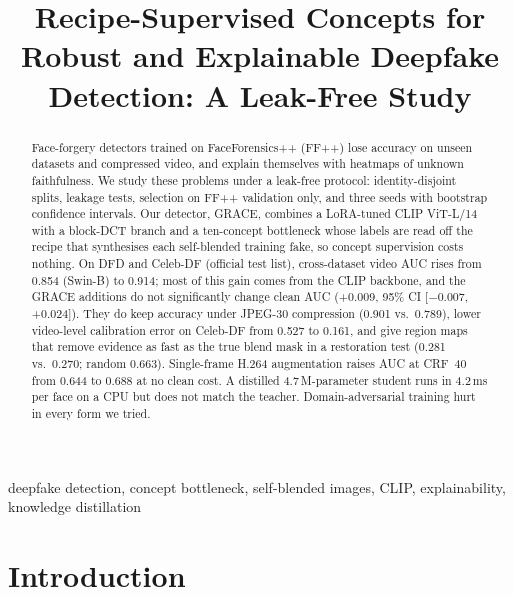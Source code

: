 \documentclass[conference]{IEEEtran}
\begin{document}
\title{Recipe-Supervised Concepts for Robust and Explainable Deepfake Detection: A Leak-Free Study}

\author{
}

\maketitle

\begin{abstract}
Face-forgery detectors trained on FaceForensics++ (FF++) lose accuracy on unseen datasets and compressed video,
and explain themselves with heatmaps of unknown faithfulness. We study these problems under a leak-free protocol:
identity-disjoint splits, leakage tests, selection on FF++ validation only, and three seeds with bootstrap
confidence intervals. Our detector, GRACE,
combines a LoRA-tuned CLIP ViT-L/14 with a block-DCT branch and a ten-concept bottleneck whose labels are read off
the recipe that synthesises each self-blended training fake, so concept supervision costs nothing. On DFD and
Celeb-DF (official test list), cross-dataset video AUC rises from 0.854 (Swin-B) to 0.914; most of this gain comes
from the CLIP backbone, and the GRACE additions do not significantly change clean AUC (+0.009, 95\% CI
[$-$0.007, +0.024]). They do keep accuracy under JPEG-30 compression (0.901 vs.\ 0.789), lower video-level
calibration error on Celeb-DF from 0.527 to 0.161, and give region maps that remove evidence as fast as the true
blend mask in a restoration test (0.281 vs.\ 0.270; random 0.663). Single-frame H.264 augmentation raises AUC at
CRF~40 from 0.644 to 0.688 at no clean cost. A distilled 4.7\,M-parameter student runs in 4.2\,ms per face on a CPU
but does not match the teacher. Domain-adversarial training hurt in every form we tried.
\end{abstract}

\begin{IEEEkeywords}
deepfake detection, concept bottleneck, self-blended images, CLIP, explainability, knowledge distillation
\end{IEEEkeywords}

\section{Introduction}
\end{document}

